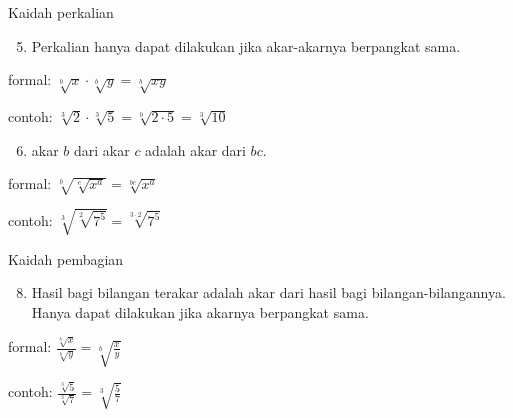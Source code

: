 \documentclass[
  ignorenonframetext,
]{beamer}
\providecommand{\tightlist}{%
  \setlength{\itemsep}{0pt}\setlength{\parskip}{0pt}}\usepackage{longtable,booktabs,array}
\begin{document}
\begin{frame}{Kaidah perkalian}
\label{kaidah-perkalian}
\begin{enumerate}
\setcounter{enumi}{4}
\tightlist
\item
  Perkalian hanya dapat dilakukan jika akar-akarnya berpangkat sama.
\end{enumerate}

formal: \(\sqrt[b]{x} \cdot \sqrt[b]{y}=\sqrt[b]{xy}\)

contoh:
\(\sqrt[3]{2} \cdot \sqrt[3]{5}=\sqrt[b]{2 \cdot 5}=\sqrt[3]{10}\)

\begin{enumerate}
\setcounter{enumi}{5}
\tightlist
\item
  akar \(b\) dari akar \(c\) adalah akar dari \(bc\).
\end{enumerate}

formal: \(\sqrt[b]{\sqrt[c]{x^a}}=\sqrt[bc]{x^a}\)

contoh: \(\sqrt[3]{\sqrt[2]{7^5}}=\sqrt[3 \cdot 2]{7^5}\)
\end{frame}

\begin{frame}{Kaidah pembagian}
\label{kaidah-pembagian}
\begin{enumerate}
\setcounter{enumi}{7}
\tightlist
\item
  Hasil bagi bilangan terakar adalah akar dari hasil bagi
  bilangan-bilangannya. Hanya dapat dilakukan jika akarnya berpangkat
  sama.
\end{enumerate}

formal: \(\frac{\sqrt[b]{x}}{\sqrt[b]{y}}=\sqrt[b]{\frac{x}{y}}\)

contoh: \(\frac{\sqrt[3]{5}}{\sqrt[3]{7}}=\sqrt[3]{\frac{5}{7}}\)
\end{frame}
\end{document}
